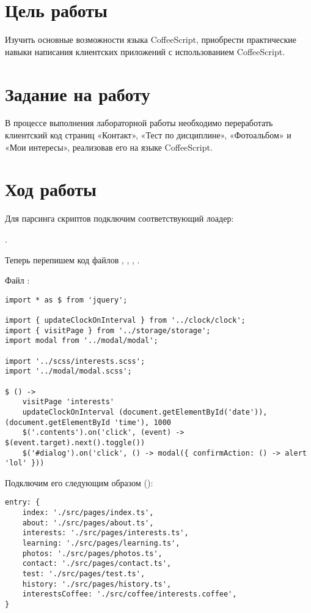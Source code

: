 \documentclass[a4paper,14pt]{extarticle}
\begin{document}


\section{Цель работы}
Изучить основные возможности языка CoffeeScript, приобрести практические
навыки написания клиентских приложений с использованием CoffeeScript.

\section{Задание на работу}
В процессе выполнения лабораторной работы необходимо переработать клиентский
код страниц «Контакт», «Тест по дисциплине», «Фотоальбом» и «Мои интересы»,
реализовав его на языке CoffeeScript.

\section{Ход работы}
Для парсинга  скриптов подключим соответствующий лоадер:

.

Теперь перепишем код файлов , ,
, .

Файл :

\begin{lstlisting}
import * as $ from 'jquery';

import { updateClockOnInterval } from '../clock/clock';
import { visitPage } from '../storage/storage';
import modal from '../modal/modal';

import '../scss/interests.scss';
import '../modal/modal.scss';

$ () ->
    visitPage 'interests'
    updateClockOnInterval (document.getElementById('date')), (document.getElementById 'time'), 1000
    $('.contents').on('click', (event) -> $(event.target).next().toggle())
    $('#dialog').on('click', () -> modal({ confirmAction: () -> alert 'lol' }))
\end{lstlisting}

Подключим его следующим образом ():
\begin{lstlisting}
entry: {
    index: './src/pages/index.ts',
    about: './src/pages/about.ts',
    interests: './src/pages/interests.ts',
    learning: './src/pages/learning.ts',
    photos: './src/pages/photos.ts',
    contact: './src/pages/contact.ts',
    test: './src/pages/test.ts',
    history: './src/pages/history.ts',
    interestsCoffee: './src/coffee/interests.coffee',
}
\end{lstlisting}
\end{document}
